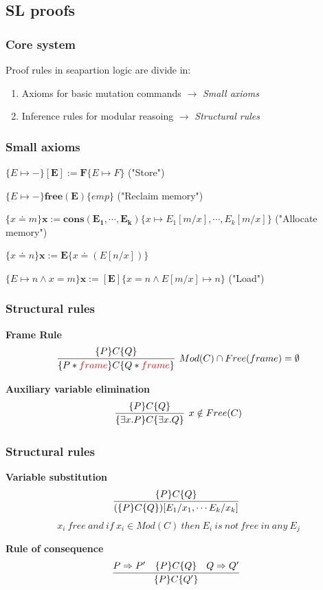\documentclass[professionalfont]{beamer}
\begin{document}
    \subsection{SL proofs}
        \begin{frame}
            \frametitle{Core system}
            Proof rules in seapartion logic  are divide in:\begin{enumerate}
                \item Axioms for basic mutation commands $\rightarrow$ \emph{Small axioms}
                \item Inference rules for modular reasoing $\rightarrow$ \emph{Structural rules}
            \end{enumerate}
        \end{frame}
        \begin{frame}
            \frametitle{Small axioms}
             
            \pause
            $\{E \mapsto - \}\mathbf{[E] := F}\{ E \mapsto F \} $ ("Store")
            
            \bigskip
            \pause
            $ \{E \mapsto -\} \mathbf{free(E)} \{emp\}$ ("Reclaim memory")
           
            \bigskip
            \pause 
            $ \{x\doteq m \}\mathbf{x:=cons(E_1,\cdots,E_k)} \{x \mapsto E_1[m/x],\cdots, E_k[m/x]\}$ ("Allocate memory")
            
            \bigskip
            \pause 
            $ \{x \doteq n\}\mathbf{x := E} \{ x \doteq (E[n/x])\}$ 
            
            \bigskip
            \pause 
            $ \{E \mapsto n \wedge  x = m\}\mathbf{x:=[E]} \{x=n \wedge E[m/x] \mapsto n\}$  ("Load")
    
           
        \end{frame}
        \begin{frame}
            \frametitle{Structural rules}
            \scriptsize
            \textbf{Frame Rule}
            $$
            \infer[Mod(C) \cap  Free(frame) = \emptyset]
            {\{P \ast \textcolor{red}{frame}\}C\{Q \ast \textcolor{red}{frame}\}}
            {\{P\}C\{Q\}}$$

            \pause
            \textbf{Auxiliary variable elimination}
            $$
            \infer[x \notin Free(C)]
            {\{\exists x.P\}C\{\exists x.Q\}}
            {\{P\}C\{Q\} }
            $$
        \end{frame}
        \begin{frame}
            \frametitle{Structural rules}
            \scriptsize
           \textbf{Variable substitution}
           $$
           \infer[]
           {(\{P\}C\{Q\})[E_1 / x_1, \cdots E_k /x_k] }
           {\{P\}C\{Q\} }$$
           $$
           x_i\ free\ and\ if\ x_i \in Mod(C)\ then\ E_i\ is\ not\ free\ in\ any\ E_j$$
           
           \pause
           \textbf{Rule of consequence}
            $$
            \infer[]
            {\{P\}C\{Q'\}}
            {P \Rightarrow P' \quad \{P\}C\{Q\} \quad Q \Rightarrow Q'}$$
        
        \end{frame}
\end{document}
